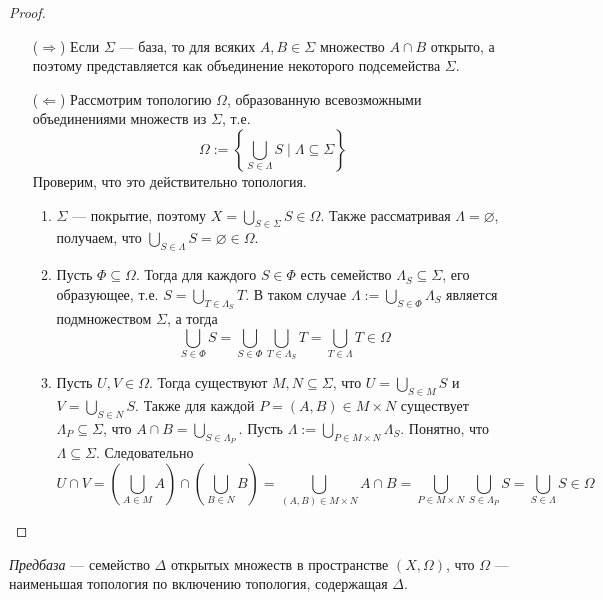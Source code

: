 \documentclass[12pt,a4paper]{article}
\begin{document}
    \begin{proof}
        \begin{itemize}
            \item[($\Rightarrow$)] Если $\Sigma$ --- база, то для всяких $A, B \in \Sigma$ множество $A \cap B$ открыто, а поэтому представляется как объединение некоторого подсемейства $\Sigma$.
            
            \item[($\Leftarrow$)] Рассмотрим топологию $\Omega$, образованную всевозможными объединениями множеств из $\Sigma$, т.е.
            \[\Omega := \left\{\bigcup_{S \in \Lambda} S \mid \Lambda \subseteq \Sigma\right\}\]
            Проверим, что это действительно топология.
            \begin{enumerate}
                \item $\Sigma$ --- покрытие, поэтому $X = \bigcup_{S \in \Sigma} S \in \Omega$. Также рассматривая $\Lambda = \varnothing$, получаем, что $\bigcup_{S \in \Lambda} S = \varnothing \in \Omega$.
                \item Пусть $\Phi \subseteq \Omega$. Тогда для каждого $S \in \Phi$ есть семейство $\Lambda_S \subseteq \Sigma$, его образующее, т.е. $S = \bigcup_{T \in \Lambda_S} T$. В таком случае $\Lambda := \bigcup_{S \in \Phi} \Lambda_S$ является подмножеством $\Sigma$, а тогда
                \[\bigcup_{S \in \Phi} S = \bigcup_{S \in \Phi} \bigcup_{T \in \Lambda_S} T = \bigcup_{T \in \Lambda} T \in \Omega\]
                \item Пусть $U, V \in \Omega$. Тогда существуют $M, N \subseteq \Sigma$, что $U = \bigcup_{S \in M} S$ и $V = \bigcup_{S \in N} S$. Также для каждой $P = (A, B) \in M \times N$ существует $\Lambda_P \subseteq \Sigma$, что $A \cap B = \bigcup_{S \in \Lambda_P}$. Пусть $\Lambda := \bigcup_{P \in M \times N} \Lambda_S$. Понятно, что $\Lambda \subseteq \Sigma$. Следовательно
                \[U \cap V = \left(\bigcup_{A \in M} A\right) \cap \left(\bigcup_{B \in N} B\right) = \bigcup_{(A, B) \in M \times N} A \cap B = \bigcup_{P \in M \times N} \bigcup_{S \in \Lambda_P} S = \bigcup_{S \in \Lambda} S \in \Omega\]
            \end{enumerate}
        \end{itemize}
    \end{proof}

    \begin{definition}
        \emph{Предбаза} --- семейство $\Delta$ открытых множеств в пространстве $(X, \Omega)$, что $\Omega$ --- наименьшая топология по включению топология, содержащая $\Delta$.
    \end{definition}
\end{document}
